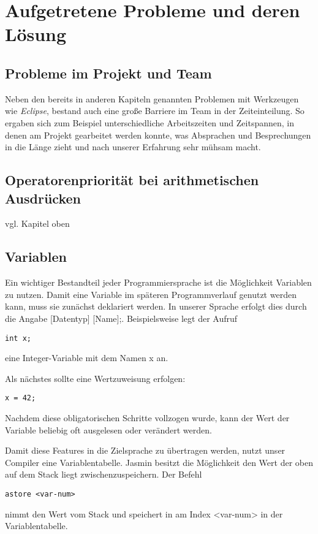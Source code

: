 
\section{Aufgetretene Probleme und deren Lösung}

\subsection{Probleme im Projekt und Team}
Neben den bereits in anderen Kapiteln genannten Problemen mit Werkzeugen wie \textit{Eclipse}, bestand auch eine große Barriere im Team in der Zeiteinteilung. So ergaben sich zum Beispiel unterschiedliche Arbeitszeiten und Zeitspannen, in denen am Projekt gearbeitet werden konnte, was Absprachen und Besprechungen in die Länge zieht und nach unserer Erfahrung sehr mühsam macht.

\subsection{Operatorenpriorität bei arithmetischen Ausdrücken}
vgl. Kapitel oben

\subsection{Variablen}
Ein wichtiger Bestandteil jeder Programmiersprache ist die Möglichkeit Variablen zu nutzen. Damit eine Variable im späteren Programmverlauf genutzt werden kann, muss sie zunächst deklariert werden. In unserer Sprache erfolgt dies durch die Angabe [Datentyp] [Name];. Beispielsweise legt der Aufruf

\begin{lstlisting}[frame=single]
int x;
\end{lstlisting}

eine Integer-Variable mit dem Namen x an.

Als nächstes sollte eine Wertzuweisung erfolgen:
\begin{lstlisting}[frame=single]
x = 42;
\end{lstlisting}

Nachdem diese obligatorischen Schritte vollzogen wurde, kann der Wert der Variable beliebig oft ausgelesen oder verändert werden.

Damit diese Features in die Zielsprache zu übertragen werden, nutzt unser Compiler eine Variablentabelle. Jasmin besitzt die Möglichkeit den Wert der oben auf dem Stack liegt zwischenzuspeichern. Der Befehl
\begin{lstlisting}[frame=single]
astore <var-num>
\end{lstlisting}
nimmt den Wert vom Stack und speichert in am Index <var-num> in der Variablentabelle.

